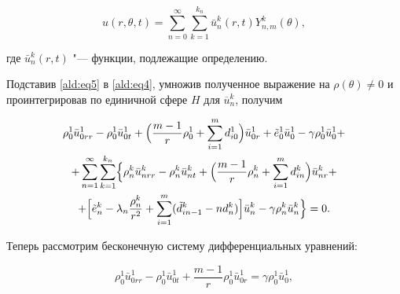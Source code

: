 \begin{equation}

u(r,\theta ,t) = {\sum\limits_{n = 0}^{\infty} {{\sum\limits_{k =

1}^{k_{n} } {\bar {u}_{n}^{k} (r,t)Y_{n,m}^{k} (\theta )}}} } ,

\label{ald:eq5}

\end{equation}

где $\bar {u}_{n}^{k} (r,t)$ "--- функции, подлежащие определению.



Подставив \eqref{ald:eq5}  в \eqref{ald:eq4}, умножив полученное выражение на $\rho(\theta)\neq 0$ и проинтегрировав по единичной сфере $H$ для $\overline{u}_n^k$, получим~\cite{aldash:4}

\begin{multline}

\label{ald:eq6}

\rho_0^1\bar{u}_{0rr}^{1} - \rho_0^1 \bar {u}_{0t}^{1} +

\Bigl(\dfrac{m-1}{r} \rho_0^1 + \sum\limits_{i=1}^m

d_{i0}^1\Bigr)\bar{u}_{0r}^1 + \tilde{e}_0^1 \bar{u}_{0}^1 -

\gamma \rho_0^1 \bar{u}_0^1 + 

\\

+

\sum\limits_{n=1}^\infty

\sum\limits_{k=1}^{k_n} 

\Bigl\{ 

\rho_n^k \bar{u}_{nrr}^{k} - \rho_n^k \bar {u}_{nt}^{k}+ 

\Bigl(\dfrac{m-1}{r}\rho_n^k + \sum\limits_{i=1}^m

d_{in}^k\Bigr)\bar{u}_{nr}^k +

\\ 

+ \Bigl[\tilde{e}_n^k - \lambda_n \dfrac{\rho_n^k}{r^2} +\sum\limits_{i=1}^m(\tilde{d}_{in-1}^k - n

d_{n}^k)\Bigr]\bar{u}_n^k - \gamma \rho_n^k \bar{u}_n^k\Bigr\} =0.

\end{multline}



Теперь рассмотрим бесконечную систему дифференциальных уравнений:

\begin{equation}

\rho_0^1\bar{u}_{0rr}^{1} - \rho_0^1 \bar {u}_{0t}^{1} +

\dfrac{m-1}{r}\rho_0^1\bar{u}_{0r}^{1}= \gamma \rho_0^1

\bar{u}_0^1,

\label{ald:eq7}

\end{equation}

